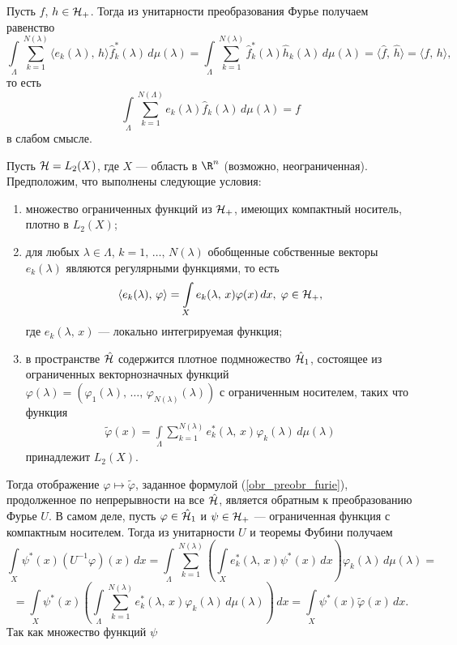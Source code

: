 \documentclass[a4paper
]{article}
\begin{document}
Пусть $f$, $h\in {\cal H}_+$. Тогда из унитарности преобразования Фурье
получаем равенство
$$\int \limits_{\Lambda}\sum \limits_{k=1}^{N(\lambda)}
\langle e_k(\lambda), \, h\rangle \hat f_k^*(\lambda)\, d\mu(\lambda)=
\int \limits_{\Lambda}\sum \limits_{k=1}^{N(\lambda)}
\hat f_k^*(\lambda)\hat h_k(\lambda)\, d\mu(\lambda)=
\langle \hat f, \, \hat h\rangle=\langle f, \, h\rangle,$$
то есть
$$\int \limits_{\Lambda}\sum \limits_{k=1}^{N(\Lambda)}e_k(\lambda)\hat f_k
(\lambda)\, d\mu(\lambda)=f$$ в слабом смысле. \par
Пусть ${\cal H}=L_2(X)$, где $X$ --- область в $\R^n$ (возможно,
неограниченная). Предположим, что выполнены следующие условия:
\begin{enumerate}
\item множество ограниченных функций из ${\cal H}_+$, имеющих компактный
носитель, плотно в $L_2(X)$;
\item для любых $\lambda\in \Lambda$, $k=1, \, \dots, \, N(\lambda)$
обобщенные собственные векторы $e_k(\lambda)$ являются регулярными
функциями, то есть
\begin{align}
\label{eklphi}
\langle e_k(\lambda), \, \varphi\rangle =\int \limits_X e_k(\lambda, \, x)
\varphi(x)\, dx, \; \varphi\in {\cal H}_+,
\end{align}
где $e_k(\lambda, \, x)$ --- локально интегрируемая функция;
\item в пространстве $\hat{{\cal H}}$ содержится плотное подмножество
$\hat{{\cal H}}_1$, состоящее из ограниченных векторнозначных
функций $\varphi(\lambda)=(\varphi_1(\lambda), \, \dots, \, \varphi
_{N(\lambda)}(\lambda))$ с ограниченным носителем, таких что функция
\begin{align}
\label{obr_preobr_furie}
\tilde \varphi(x)=\int \limits _{\Lambda}\sum \limits _{k=1}^{N(\lambda)}
e^*_k(\lambda, \, x)\varphi _k(\lambda)\, d\mu(\lambda)
\end{align}
принадлежит $L_2(X)$.
\end{enumerate}
Тогда отображение $\varphi\mapsto \tilde \varphi$, заданное формулой
(\ref{obr_preobr_furie}), продолженное по непрерывности на все
$\hat{{\cal H}}$, является обратным к преобразованию Фурье $U$. В самом
деле, пусть $\varphi\in \hat{{\cal H}}_1$ и $\psi\in {\cal H}_+$ ---
ограниченная функция с компактным носителем. Тогда из унитарности $U$
и теоремы Фубини получаем $$\int \limits_X \psi^*(x)(U^{-1}\varphi)(x)\, dx=
\int \limits_{\Lambda}\sum \limits_{k=1}^{N(\lambda)}\left(\int
\limits_X e^*_k(\lambda, \, x)\psi^*(x)\, dx\right)\varphi_k(\lambda)
\, d\mu(\lambda)=$$ $$=\int \limits_X \psi^*(x)\left(\int \limits
_{\Lambda}\sum \limits_{k=1}^{N(\lambda)}e^*_k(\lambda, \, x)
\varphi_k(\lambda)\, d\mu(\lambda)\right)\, dx=\int \limits _X
\psi^*(x)\tilde \varphi(x)\, dx.$$ Так как множество функций $\psi$
\end{document}
